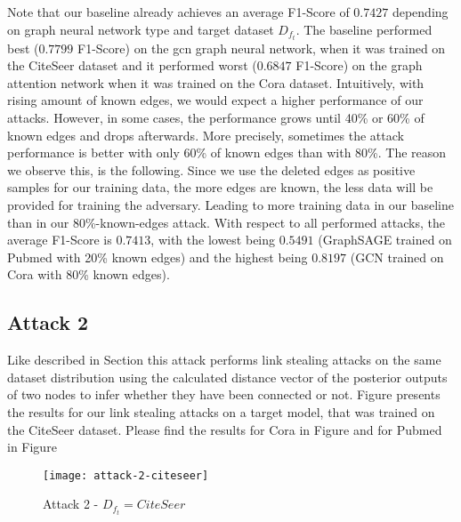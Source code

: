             Note that our baseline already achieves an average F1-Score of $0.7427$ depending on graph neural network type and target dataset $D_{f_t}$.
            The baseline performed best ($0.7799$ F1-Score) on the gcn graph neural network, when it was trained on the  CiteSeer dataset and it performed worst ($0.6847$ F1-Score) on the graph attention network when it was trained on the Cora dataset.
            Intuitively, with rising amount of known edges, we would expect a higher performance of our attacks.
            However, in some cases, the performance grows until 40\% or 60\% of known edges and drops afterwards.
            More precisely, sometimes the attack performance is better with only 60\% of known edges than with 80\%.
            The reason we observe this, is the following. 
            Since we use the deleted edges as positive samples for our training data, the more edges are known, the less data will be provided for training the adversary. 
            Leading to more training data in our baseline than in our 80\%-known-edges attack.
            With respect to all performed attacks, the average F1-Score is $0.7413$, with the lowest being $0.5491$ (GraphSAGE trained on Pubmed with 20\% known edges) and the highest being $0.8197$ (GCN trained on Cora with 80\% known edges).

        \subsection*{Attack 2}
            Like described in Section  this attack performs link stealing attacks on the same dataset distribution using the calculated distance vector of the posterior outputs of two nodes to infer whether they have been connected or not. 
            Figure  presents the results for our link stealing attacks on a target model, that was trained on the CiteSeer dataset.
            Please find the results for Cora in Figure  and for Pubmed in Figure 

            \begin{figure}[h]
                \begin{center}
                    \texttt{[image: attack-2-citeseer]}
                    \caption{Attack 2 - $D_{f_t} = CiteSeer$}
                    \label{figure:eval-att2-citeseer}
                \end{center}
            \end{figure}

